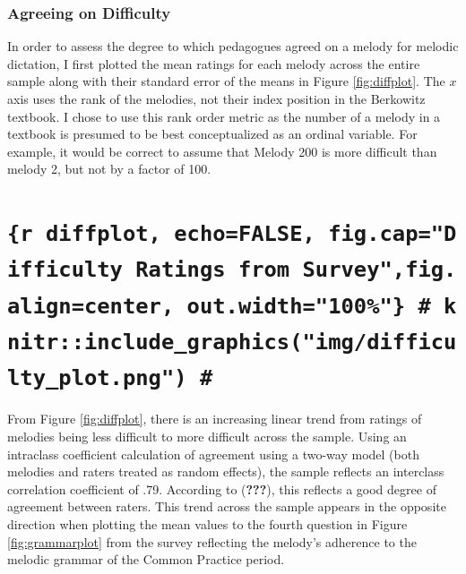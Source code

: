 \documentclass[english,man,floatsintext]{apa6}
\begin{document}
\hypertarget{agreeing-on-difficulty}{%
\subsubsection{Agreeing on Difficulty}\label{agreeing-on-difficulty}}

In order to assess the degree to which pedagogues agreed on a melody for melodic dictation, I first plotted the mean ratings for each melody across the entire sample along with their standard error of the means in Figure \ref{fig:diffplot}.
The \(x\) axis uses the rank of the melodies, not their index position in the Berkowitz textbook.
I chose to use this rank order metric as the number of a melody in a textbook is presumed to be best conceptualized as an ordinal variable.
For example, it would be correct to assume that Melody 200 is more difficult than melody 2, but not by a factor of 100.

\hypertarget{r-diffplot-echofalse-fig.capdifficulty-ratings-from-surveyfig.aligncenter-out.width100-knitrinclude_graphicsimgdifficulty_plot.png}{%
\section{\texorpdfstring{\texttt{\{r\ diffplot,\ echo=FALSE,\ fig.cap="Difficulty\ Ratings\ from\ Survey",fig.align=\textquotesingle{}center\textquotesingle{},\ out.width="100\%"\}\ \#\ knitr::include\_graphics("img/difficulty\_plot.png")\ \#}}{\{r diffplot, echo=FALSE, fig.cap="Difficulty Ratings from Survey",fig.align='center', out.width="100\%"\} \# knitr::include\_graphics("img/difficulty\_plot.png") \#}}\label{r-diffplot-echofalse-fig.capdifficulty-ratings-from-surveyfig.aligncenter-out.width100-knitrinclude_graphicsimgdifficulty_plot.png}}

From Figure \ref{fig:diffplot}, there is an increasing linear trend from ratings of melodies being less difficult to more difficult across the sample.
Using an intraclass coefficient calculation of agreement using a two-way model (both melodies and raters treated as random effects), the sample reflects an interclass correlation coefficient of .79.
According to ({\textbf{???}}), this reflects a good degree of agreement between raters.
This trend across the sample appears in the opposite direction when plotting the mean values to the fourth question in Figure \ref{fig:grammarplot} from the survey reflecting the melody's adherence to the melodic grammar of the Common Practice period.
\end{document}
